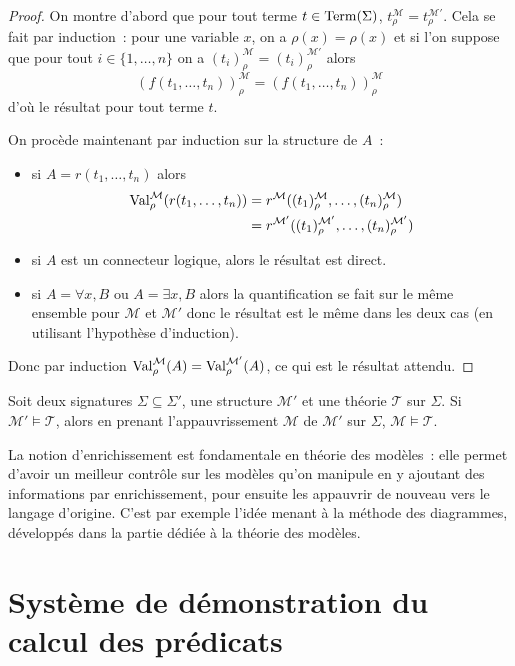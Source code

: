 \begin{proof}
  On montre d'abord que pour tout terme $t\in\operatorname{Term}(\Sigma)$,
  $t_\rho^\mathcal M = t_\rho^{\mathcal M'}$. Cela se fait par induction~: pour une
  variable $x$, on a $\rho(x) = \rho(x)$ et si l'on suppose que pour tout
  $i\in\{1,\ldots,n\}$ on a $(t_i)_\rho^\mathcal M = (t_i)_\rho^{\mathcal M'}$ alors
  \[(f(t_1,\ldots,t_n))_\rho^\mathcal M = (f(t_1,\ldots,t_n))_\rho^\mathcal M\]
  d'où le résultat pour tout terme $t$.
  
  On procède maintenant par induction sur la structure de $A$~:
  \begin{itemize}
  \item si $A = r(t_1,\ldots,t_n)$ alors
    \begin{align*}
      \operatorname{Val}_\rho^\mathcal M(r(t_1,\ldots,t_n)) &= r^\mathcal M((t_1)_\rho^\mathcal M,
      \ldots,(t_n)_\rho^\mathcal M) \\
      &= r^{\mathcal M'}((t_1)_\rho^{\mathcal M'},\ldots,(t_n)_{\rho}^{\mathcal M'})
    \end{align*}
  \item si $A$ est un connecteur logique, alors le résultat est direct.
  \item si $A = \forall x, B$ ou $A = \exists x, B$ alors la quantification se
    fait sur le même ensemble pour $\mathcal M$ et $\mathcal M'$ donc le
    résultat est le même dans les deux cas (en utilisant l'hypothèse
    d'induction).
  \end{itemize}
  Donc par induction $\operatorname{Val}_\rho^\mathcal M(A) = \operatorname{Val}_\rho^{\mathcal M'}(A)$,
  ce qui est le résultat attendu.
\end{proof}

\begin{corollary}
  Soit deux signatures $\Sigma\subseteq\Sigma'$, une structure $\mathcal M'$
  et une théorie $\mathcal T$ sur $\Sigma$. Si $\mathcal M'\models \mathcal T$,
  alors en prenant l'appauvrissement $\mathcal M$ de $\mathcal M'$ sur $\Sigma$,
  $\mathcal M\models \mathcal T$.
\end{corollary}

La notion d'enrichissement est fondamentale en théorie des modèles~: elle
permet d'avoir un meilleur contrôle sur les modèles qu'on manipule en y ajoutant
des informations par enrichissement, pour ensuite les appauvrir de nouveau vers
le langage d'origine. C'est par exemple l'idée menant à la méthode des
diagrammes, développés dans la partie dédiée à la théorie des modèles.

\section[Syntaxe de preuves]{Système de démonstration du calcul des prédicats}

